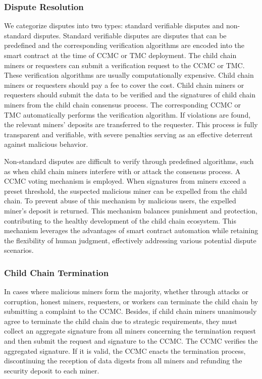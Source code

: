 \documentclass[10pt,journal]{IEEEtran}
\begin{document}
\subsubsection{\textbf{Dispute Resolution}}\label{subsubsec:dispute_resolution}
We categorize disputes into two types: standard verifiable disputes and non-standard disputes. Standard verifiable disputes are disputes that can be predefined and the corresponding verification algorithms are encoded into the smart contract at the time of CCMC or TMC deployment. The child chain miners or requesters can submit a verification request to the CCMC or TMC. These verification algorithms are usually computationally expensive. Child chain miners or requesters should pay a fee to cover the cost. Child chain miners or requesters should submit the data to be verified and the signatures of child chain miners from the child chain consensus process. The corresponding CCMC or TMC automatically performs the verification algorithm. If violations are found, the relevant miners' deposits are transferred to the requester. This process is fully transparent and verifiable, with severe penalties serving as an effective deterrent against malicious behavior.

Non-standard disputes are difficult to verify through predefined algorithms, such as when child chain miners interfere with or attack the consensus process. A CCMC voting mechanism is employed. When signatures from miners exceed a preset threshold, the suspected malicious miner can be expelled from the child chain. To prevent abuse of this mechanism by malicious users, the expelled miner's deposit is returned. This mechanism balances punishment and protection, contributing to the healthy development of the child chain ecosystem. This mechanism leverages the advantages of smart contract automation while retaining the flexibility of human judgment, effectively addressing various potential dispute scenarios.

\subsubsection{\textbf{ Child Chain Termination}}\label{subsubsec:terminate}

In cases where malicious miners form the majority, whether through attacks or corruption, honest miners, requesters, or workers can terminate the child chain by submitting a complaint to the CCMC. Besides, if child chain miners unanimously agree to terminate the child chain due to strategic requirements, they must collect an aggregate signature from all miners concerning the termination request and then submit the request and signature to the CCMC. The CCMC verifies the aggregated signature. If it is valid, the CCMC enacts the termination process, discontinuing the reception of data digests from all miners and refunding the security deposit to each miner.
\end{document}
